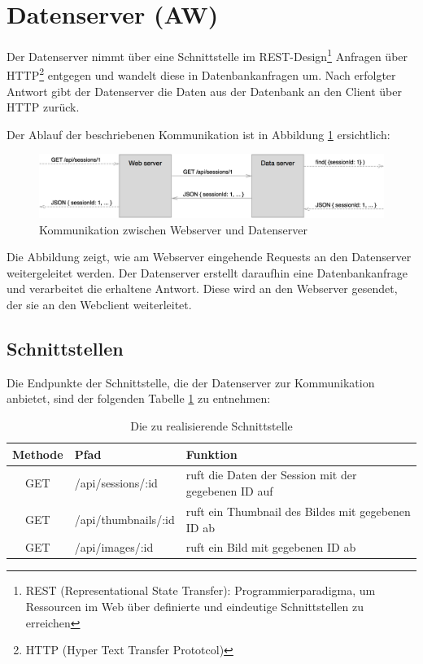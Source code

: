 \clearpage
\section{Datenserver (AW)}
\label{section_datenserver}
Der Datenserver nimmt über eine Schnittstelle im REST-Design\footnote{REST 
(Representational State Transfer): Programmierparadigma, um Ressourcen im Web über 
definierte und eindeutige Schnittstellen zu erreichen} Anfragen über HTTP\footnote{HTTP 
(Hyper Text Transfer Prototcol)} entgegen und wandelt diese in Datenbankanfragen um. 
Nach erfolgter Antwort gibt der Datenserver die Daten aus der Datenbank an den Client 
über HTTP zurück.

Der Ablauf der beschriebenen Kommunikation ist in Abbildung 
\ref{fig_kommunikation_webserver_datenserver} ersichtlich:

\begin{figure}[h]
	\centering
	\includegraphics[width=\textwidth]{bilder/abbildung_request_from_webserver_to_dataserver}
	\caption{Kommunikation zwischen Webserver und Datenserver}
	\label{fig_kommunikation_webserver_datenserver}
\end{figure}

Die Abbildung zeigt, wie am Webserver eingehende Requests an den Datenserver weitergeleitet werden.
Der Datenserver erstellt daraufhin eine Datenbankanfrage und verarbeitet die erhaltene 
Antwort. Diese wird an den Webserver gesendet, der sie an den Webclient weiterleitet.

\subsection{Schnittstellen}
Die Endpunkte der Schnittstelle, die der Datenserver zur Kommunikation anbietet, 
sind der folgenden Tabelle \ref{tab_dataserver_api_routes} zu entnehmen:

\begin{table}[h]
	\begin{center}
		\begin{tabularx}{\textwidth}{|c|l|X|}
			\hline
			\textbf{Methode} & \textbf{Pfad} & \textbf{Funktion}\\
			\hline
			GET & /api/sessions/:id & ruft die Daten der Session mit der gegebenen ID auf \\
			\hline
			GET & /api/thumbnails/:id & ruft ein Thumbnail des Bildes mit gegebenen ID ab \\
			\hline
			GET & /api/images/:id & ruft ein Bild mit gegebenen ID ab \\
			\hline
		\end{tabularx}
		\caption{Die zu realisierende Schnittstelle}
		\label{tab_dataserver_api_routes}
	\end{center}
\end{table}

